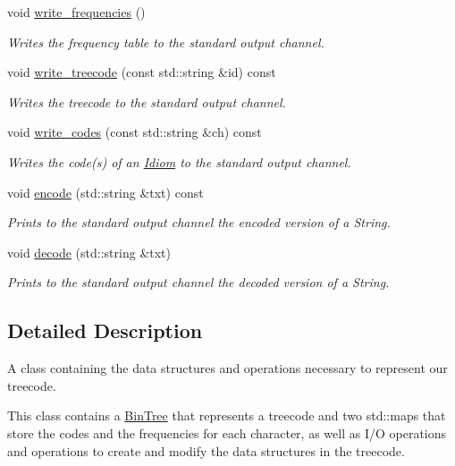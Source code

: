\begin{DoxyCompactItemize}
void \hyperlink{classTreecode_a3f69c17073356f2bbc8ce274c3583c2c}{write\+\_\+frequencies} ()
\begin{DoxyCompactList}\small\item\em Writes the frequency table to the standard output channel. \end{DoxyCompactList}\item 
void \hyperlink{classTreecode_aa2d4b5bb9f0c0dd4e4115498c6765b59}{write\+\_\+treecode} (const std\+::string \&id) const
\begin{DoxyCompactList}\small\item\em Writes the treecode to the standard output channel. \end{DoxyCompactList}\item 
void \hyperlink{classTreecode_a703ddb41f7d2260b54808e0293104502}{write\+\_\+codes} (const std\+::string \&ch) const
\begin{DoxyCompactList}\small\item\em Writes the code(s) of an \hyperlink{classIdiom}{Idiom} to the standard output channel. \end{DoxyCompactList}\item 
void \hyperlink{classTreecode_accab83a4e32dcb0c17ec67ab40f020cc}{encode} (std\+::string \&txt) const
\begin{DoxyCompactList}\small\item\em Prints to the standard output channel the encoded version of a String. \end{DoxyCompactList}\item 
void \hyperlink{classTreecode_ad1da0bce9134c31f346bf24997f17156}{decode} (std\+::string \&txt)
\begin{DoxyCompactList}\small\item\em Prints to the standard output channel the decoded version of a String. \end{DoxyCompactList}\end{DoxyCompactItemize}


\subsection{Detailed Description}
A class containing the data structures and operations necessary to represent our treecode. 

This class contains a \hyperlink{classBinTree}{Bin\+Tree} that represents a treecode and two std\+::map\textquotesingle{}s that store the codes and the frequencies for each character, as well as I/O operations and operations to create and modify the data structures in the treecode. 

